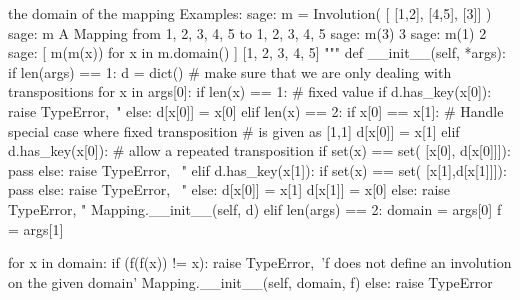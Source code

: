 \begin{sageblock}
    the domain of the mapping
    Examples: 
        sage: m = Involution( [  [1,2], [4,5], [3]] )
        sage: m
        A Mapping from {1, 2, 3, 4, 5} to {1, 2, 3, 4, 5}
        sage: m(3)
        3
        sage: m(1)
        2
        sage: [ m(m(x)) for x in m.domain() ]
        [1, 2, 3, 4, 5]
    """
    def __init__(self, *args):
        if len(args) == 1:
            d = dict()
            # make sure that we are only dealing with transpositions
            for x in args[0]:
                if len(x) == 1:
                    # fixed value
                    if d.has_key(x[0]):
                        raise TypeError,\
                        "%
                    else:
                        d[x[0]] = x[0]
                elif len(x) == 2:
                    if x[0] == x[1]:
                        # Handle special case where fixed transposition 
                        # is given as [1,1]
                        d[x[0]] = x[1]
                    elif d.has_key(x[0]):
                        # allow a repeated transposition
                        if set(x) == set( [x[0], d[x[0]]]):
                            pass
                        else:
                            raise TypeError, \
                            "%
                    elif d.has_key(x[1]):
                        if set(x) == set( [x[1],d[x[1]]]):
                            pass
                        else:
                            raise TypeError, \
                            "%
                    else:
                        d[x[0]] = x[1]
                        d[x[1]] = x[0]
                else:
                    raise TypeError, "%
            Mapping.__init__(self, d)
        elif len(args) == 2:
            domain = args[0]
            f = args[1]

            for x in domain:
                if (f(f(x)) != x):
                    raise TypeError,\
                    'f does not define an involution on the given domain'
            Mapping.__init__(self, domain, f)
        else: 
            raise TypeError
\end{sageblock}
